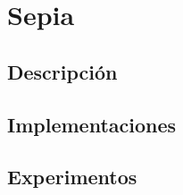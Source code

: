 \section{Sepia}

\subsection{Descripción}

\subsection{Implementaciones}

\subsection{Experimentos}

